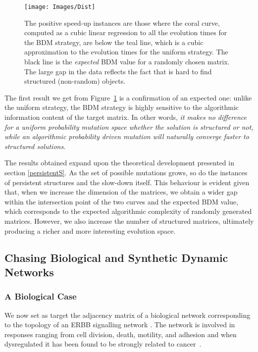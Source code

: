 \documentclass[10pt]{article}
\begin{document}
\begin{figure}[ht!]
    \centering
    \texttt{[image: Images/Dist]}
    \caption{The positive speed-up instances are those where the coral curve, computed as a cubic linear regression to all the evolution times for the BDM strategy, are below the teal line, which is a cubic approximation to the evolution times for the uniform strategy. The black line is the \emph{expected} BDM value for a randomly chosen matrix. The large gap in the data reflects the fact that is hard to find structured (non-random) objects.
        \label{distributionG}}
\end{figure}

The first result we get from Figure~\ref{distributionG} is a confirmation of an expected one: unlike the uniform strategy, the BDM strategy is highly sensitive to the algorithmic information content of the target matrix. In other words, \textit{it makes no difference for a uniform probability mutation space whether the solution is structured or not, while an algorithmic probability driven mutation will naturally converge faster to structured solutions}.

The results obtained expand upon the theoretical development presented in section \ref{persistentS}. As the set of possible mutations grows, so do the instances of persistent structures and the slow-down itself. This behaviour is evident given that, when we increase the dimension of the matrices, we obtain a wider gap within the intersection point of the two curves and the expected BDM value, which corresponds to the expected algorithmic complexity of randomly generated matrices. However, we also increase the number of structured matrices, ultimately producing a richer and more interesting evolution space.

\subsection{Chasing Biological and Synthetic Dynamic Networks}

\subsubsection{A Biological Case}

We now set as target the adjacency
matrix of a biological network corresponding to the topology of an ERBB signalling network \cite{kiani2014dynamic}. The network is involved in responses ranging from cell division, death, motility, and adhesion and when dysregulated it has been found to be strongly related to cancer~\cite{erbb,erbb2}.
\end{document}
